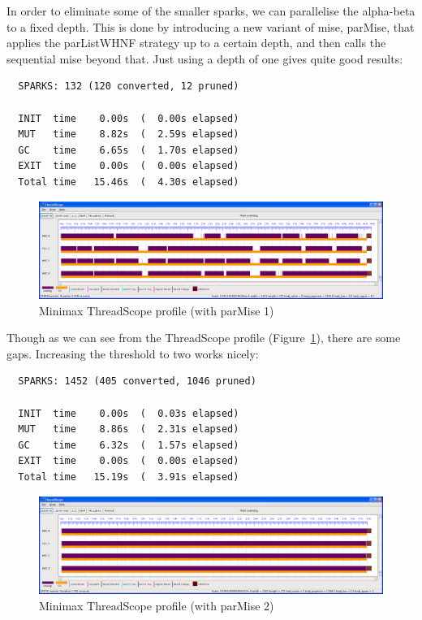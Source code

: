 \documentclass[twocolumn,9pt]{sigplanconf}
\newcommand{\codef}[1]{{\fontfamily{cmss}\small#1}}
\begin{document}
In order to eliminate some of the smaller sparks, we can
parallelise the alpha-beta to a fixed depth.  This is done by
introducing a new variant of \codef{mise}, \codef{parMise}, that
applies the \codef{parListWHNF} strategy up to a certain depth, and then
calls the sequential \codef{mise} beyond that.  Just using a depth of
one gives quite good results:

\begin{verbatim}
  SPARKS: 132 (120 converted, 12 pruned)

  INIT  time    0.00s  (  0.00s elapsed)
  MUT   time    8.82s  (  2.59s elapsed)
  GC    time    6.65s  (  1.70s elapsed)
  EXIT  time    0.00s  (  0.00s elapsed)
  Total time   15.46s  (  4.30s elapsed)
\end{verbatim}

\begin{figure}
\begin{center}
\includegraphics[scale=0.3]{minimax2.png}
\end{center}
\caption{Minimax ThreadScope profile (with parMise 1)}
\label{f:minimax-threadscope2}
\end{figure}

Though as we can see from the ThreadScope profile
(Figure~\ref{f:minimax-threadscope2}), there are some gaps.
Increasing the threshold to two works nicely:

\begin{verbatim}
  SPARKS: 1452 (405 converted, 1046 pruned)

  INIT  time    0.00s  (  0.03s elapsed)
  MUT   time    8.86s  (  2.31s elapsed)
  GC    time    6.32s  (  1.57s elapsed)
  EXIT  time    0.00s  (  0.00s elapsed)
  Total time   15.19s  (  3.91s elapsed)
\end{verbatim}

\begin{figure}
\begin{center}
\includegraphics[scale=0.3]{minimax3.png}
\end{center}
\caption{Minimax ThreadScope profile (with parMise 2)}
\label{f:minimax-threadscope3}
\end{figure}
\end{document}
